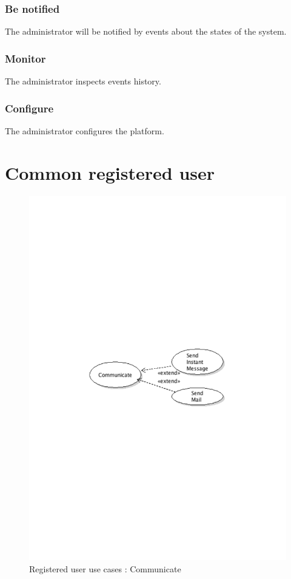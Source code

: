 		\subsubsection{Be notified}
			The administrator will be notified by events about the states of the system.
		\subsubsection{Monitor}
			The administrator inspects events history.
		\subsubsection{Configure}
			The administrator configures the platform.
\section{Common registered user}
	\begin{figure}[ht]
		\begin{center}
			\includegraphics[width=\textwidth,  trim=2cm 12cm 2cm 12cm]{UML_figure/use_cases/common/UC_Common_Communicate.pdf}
			\caption{Registered user use cases : Communicate}
		\end{center}
	\end{figure}
